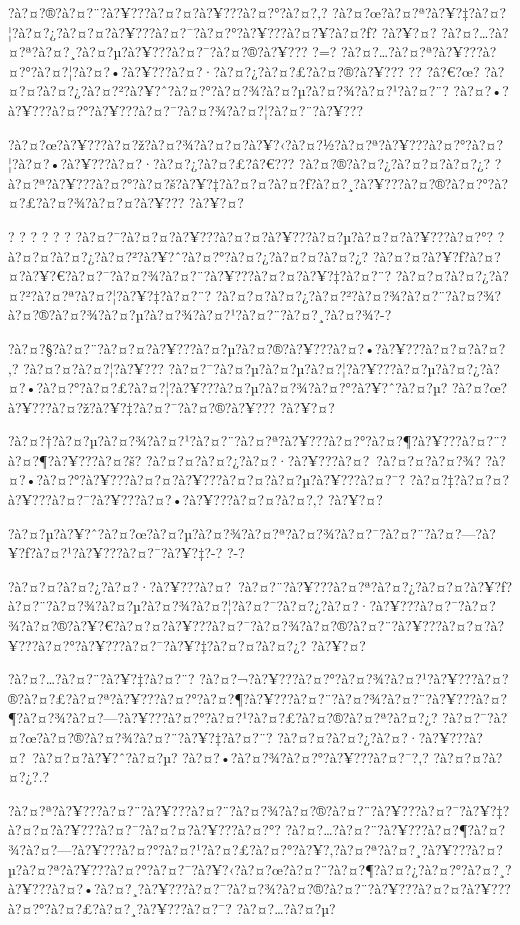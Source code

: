 \documentclass[11pt, openany]{book}
\begin{document}
{{{{{{{{{{?à?¤?®?à?¤?¨?à?¥???à?¤?¤?à?¥???à?¤?°?à?¤?‚?
?à?¤?œ?à?¤?ª?à?¥?‡?à?¤?¦?à?¤?¿?à?¤?¤?à?¥???à?¤?¯?à?¤?°?à?¥???à?¤?¥?à?¤?ƒ?
?à?¥?¤? ?à?¤?\ldots{}?à?¤?ª?à?¤?¸?à?¤?µ?à?¥???à?¤?¯?à?¤?®?à?¥??? ?=?
?à?¤?\ldots{}?à?¤?ª?à?¥???à?¤?°?à?¤?¦?à?¤?•?à?¥???à?¤?·?à?¤?¿?à?¤?£?à?¤?®?à?¥???
?\textbar{}? ?â?€?œ?
?à?¤?¤?à?¤?¿?à?¤?²?à?¥?ˆ?à?¤?°?à?¤?¾?à?¤?µ?à?¤?¾?à?¤?¹?à?¤?¨?
?à?¤?•?à?¥???à?¤?°?à?¥???à?¤?¯?à?¤?¾?à?¤?¦?à?¤?¨?à?¥???

?à?¤?œ?à?¥???à?¤?ž?à?¤?¾?à?¤?¤?à?¥?‹?à?¤?½?à?¤?ª?à?¥???à?¤?°?à?¤?¦?à?¤?•?à?¥???à?¤?·?à?¤?¿?à?¤?£?â?€???
?à?¤?®?à?¤?¿?à?¤?¤?à?¤?¿?
?à?¤?ª?à?¥???à?¤?°?à?¤?š?à?¥?‡?à?¤?¤?à?¤?ƒ?à?¤?¸?à?¥???à?¤?®?à?¤?°?à?¤?£?à?¤?¾?à?¤?¤?à?¥???
?à?¥?¤?

? ? ? ? ? ? ?à?¤?¯?à?¤?¤?à?¥???à?¤?¤?à?¥???à?¤?µ?à?¤?¤?à?¥???à?¤?°?
?à?¤?¤?à?¤?¿?à?¤?²?à?¥?ˆ?à?¤?°?à?¤?¿?à?¤?¤?à?¤?¿?
?à?¤?¤?à?¥?ƒ?à?¤?¤?à?¥?€?à?¤?¯?à?¤?¾?à?¤?¨?à?¥???à?¤?¤?à?¥?‡?à?¤?¨?
?à?¤?¤?à?¤?¿?à?¤?²?à?¤?ª?à?¤?¦?à?¥?‡?à?¤?¨?
?à?¤?¤?à?¤?¿?à?¤?²?à?¤?¾?à?¤?¨?à?¤?¾?à?¤?®?à?¤?¾?à?¤?µ?à?¤?¾?à?¤?¹?à?¤?¨?à?¤?¸?à?¤?¾?-?

?à?¤?§?à?¤?¨?à?¤?¤?à?¥???à?¤?µ?à?¤?®?à?¥???à?¤?•?à?¥???à?¤?¤?à?¤?‚?
?à?¤?¤?à?¤?¦?à?¥???
?à?¤?¯?à?¤?µ?à?¤?µ?à?¤?¦?à?¥???à?¤?µ?à?¤?¿?à?¤?•?à?¤?°?à?¤?£?à?¤?¦?à?¥???à?¤?µ?à?¤?¾?à?¤?°?à?¥?ˆ?à?¤?µ?
?à?¤?œ?à?¥???à?¤?ž?à?¥?‡?à?¤?¯?à?¤?®?à?¥??? ?à?¥?¤?

?à?¤?†?à?¤?µ?à?¤?¾?à?¤?¹?à?¤?¨?à?¤?ª?à?¥???à?¤?°?à?¤?¶?à?¥???à?¤?¨?à?¤?¶?à?¥???à?¤?š?
?à?¤?¤?à?¤?¿?à?¤?·?à?¥???à?¤?~?à?¤?¤?à?¤?¾?
?à?¤?•?à?¤?°?à?¥???à?¤?¤?à?¥???à?¤?¤?à?¤?µ?à?¥???à?¤?¯?
?à?¤?‡?à?¤?¤?à?¥???à?¤?¯?à?¥???à?¤?•?à?¥???à?¤?¤?à?¤?‚? ?à?¥?¤?

?à?¤?µ?à?¥?ˆ?à?¤?œ?à?¤?µ?à?¤?¾?à?¤?ª?à?¤?¾?à?¤?¯?à?¤?¨?à?¤?---?à?¥?ƒ?à?¤?¹?à?¥???à?¤?¯?à?¥?‡?-?
?-?

?à?¤?¤?à?¤?¿?à?¤?·?à?¥???à?¤?~?à?¤?¨?à?¥???à?¤?ª?à?¤?¿?à?¤?¤?à?¥?ƒ?à?¤?¨?à?¤?¾?à?¤?µ?à?¤?¾?à?¤?¦?à?¤?¯?à?¤?¿?à?¤?·?à?¥???à?¤?¯?à?¤?¾?à?¤?®?à?¥?€?à?¤?¤?à?¥???à?¤?¯?à?¤?¾?à?¤?®?à?¤?¨?à?¥???à?¤?¤?à?¥???à?¤?°?à?¥???à?¤?¯?à?¥?‡?à?¤?¤?à?¤?¿?
?à?¥?¤?

?à?¤?\ldots{}?à?¤?¨?à?¥?‡?à?¤?¨?
?à?¤?¬?à?¥???à?¤?°?à?¤?¾?à?¤?¹?à?¥???à?¤?®?à?¤?£?à?¤?ª?à?¥???à?¤?°?à?¤?¶?à?¥???à?¤?¨?à?¤?¾?à?¤?¨?à?¥???à?¤?¶?à?¤?¾?à?¤?---?à?¥???à?¤?°?à?¤?¹?à?¤?£?à?¤?®?à?¤?ª?à?¤?¿?
?à?¤?¯?à?¤?œ?à?¤?®?à?¤?¾?à?¤?¨?à?¥?‡?à?¤?¨?
?à?¤?¤?à?¤?¿?à?¤?·?à?¥???à?¤?~?à?¤?¤?à?¥?ˆ?à?¤?µ?
?à?¤?•?à?¤?¾?à?¤?°?à?¥???à?¤?¯?,? ?à?¤?¤?à?¤?¿?.?

?à?¤?ª?à?¥???à?¤?¨?à?¥???à?¤?¨?à?¤?¾?à?¤?®?à?¤?¨?à?¥???à?¤?¯?à?¥?‡?à?¤?¤?à?¥???à?¤?¯?à?¤?¤?à?¥???à?¤?°?
?à?¤?\ldots{}?à?¤?¨?à?¥???à?¤?¶?à?¤?¾?à?¤?---?à?¥???à?¤?°?à?¤?¹?à?¤?£?à?¤?°?à?¥?‚?à?¤?ª?à?¤?¸?à?¥???à?¤?µ?à?¤?ª?à?¥???à?¤?°?à?¤?¯?à?¥?‹?à?¤?œ?à?¤?¨?à?¤?¶?à?¤?¿?à?¤?°?à?¤?¸?à?¥???à?¤?•?à?¤?¸?à?¥???à?¤?¯?à?¤?¾?à?¤?®?à?¤?¨?à?¥???à?¤?¤?à?¥???à?¤?°?à?¤?£?à?¤?¸?à?¥???à?¤?¯?
?à?¤?\ldots{}?à?¤?µ?

}}}}}}}}}}
\end{document}
